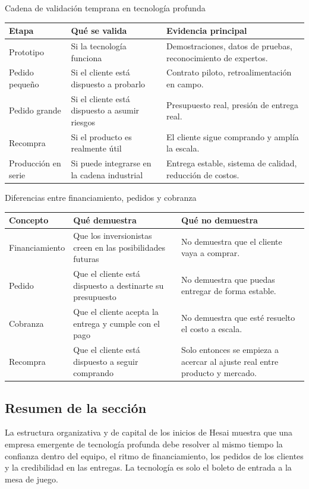 \begin{knowledgebox}{Cadena de validación temprana en tecnología profunda}
\begin{tabularx}{\textwidth}{p{}p{}X}
\toprule
Etapa & Qué se valida & Evidencia principal \\
\midrule
Prototipo & Si la tecnología funciona & Demostraciones, datos de pruebas, reconocimiento de expertos. \\
Pedido pequeño & Si el cliente está dispuesto a probarlo & Contrato piloto, retroalimentación en campo. \\
Pedido grande & Si el cliente está dispuesto a asumir riesgos & Presupuesto real, presión de entrega real. \\
Recompra & Si el producto es realmente útil & El cliente sigue comprando y amplía la escala. \\
Producción en serie & Si puede integrarse en la cadena industrial & Entrega estable, sistema de calidad, reducción de costos. \\
\bottomrule
\end{tabularx}
\end{knowledgebox}

\begin{knowledgebox}{Diferencias entre financiamiento, pedidos y cobranza}
\begin{tabularx}{\textwidth}{p{}p{}X}
\toprule
Concepto & Qué demuestra & Qué no demuestra \\
\midrule
Financiamiento & Que los inversionistas creen en las posibilidades futuras & No demuestra que el cliente vaya a comprar. \\
Pedido & Que el cliente está dispuesto a destinarte su presupuesto & No demuestra que puedas entregar de forma estable. \\
Cobranza & Que el cliente acepta la entrega y cumple con el pago & No demuestra que esté resuelto el costo a escala. \\
Recompra & Que el cliente está dispuesto a seguir comprando & Solo entonces se empieza a acercar al ajuste real entre producto y mercado. \\
\bottomrule
\end{tabularx}
\end{knowledgebox}

\subsection{Resumen de la sección}

La estructura organizativa y de capital de los inicios de Hesai muestra que una empresa emergente de tecnología profunda debe resolver al mismo tiempo la confianza dentro del equipo, el ritmo de financiamiento, los pedidos de los clientes y la credibilidad en las entregas. La tecnología es solo el boleto de entrada a la mesa de juego.
